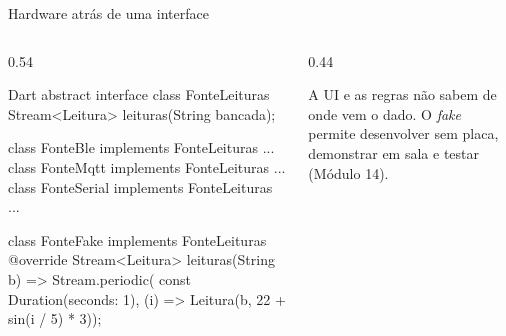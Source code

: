 \documentclass[aspectratio=169,10pt]{beamer}
\begin{document}
\begin{frame}[fragile]{Hardware atrás de uma interface}
  \begin{columns}[T]
    \begin{column}{0.54\textwidth}
\begin{codigo}[title=data/services/fonte\_leituras.dart]{Dart}
abstract interface class FonteLeituras {
  Stream<Leitura> leituras(String bancada);
}

class FonteBle implements FonteLeituras { ... }
class FonteMqtt implements FonteLeituras { ... }
class FonteSerial implements FonteLeituras { ... }

class FonteFake implements FonteLeituras {
  @override
  Stream<Leitura> leituras(String b) => Stream.periodic(
      const Duration(seconds: 1),
      (i) => Leitura(b, 22 + sin(i / 5) * 3));
}
\end{codigo}
    \end{column}
    \begin{column}{0.44\textwidth}
      \centering
      \begin{conceito}
        A UI e as regras não sabem de onde vem o dado. O \emph{fake} permite desenvolver sem placa, demonstrar em sala e testar (Módulo 14).
      \end{conceito}
    \end{column}
  \end{columns}
\end{frame}
\end{document}
